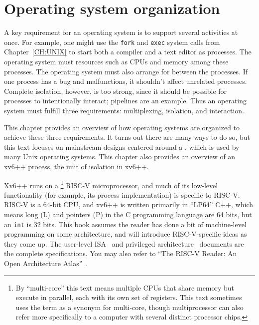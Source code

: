 
\chapter{Operating system organization}
\label{CH:FIRST}

A key requirement for an operating system is to support several activities at once.  For
example,
one might use the {\tt fork} and {\tt exec} system calls from
Chapter~\ref{CH:UNIX}
to start both a compiler and a text editor as processes.
The operating system must
resources such as CPUs and memory among these processes.
The operating system must also arrange for
between the processes.
If one process has a bug and malfunctions,
it shouldn't affect unrelated processes.
Complete isolation, however, is too strong, since it should be possible for
processes to intentionally interact; pipelines are an example.
Thus
an operating system must fulfill three requirements: multiplexing, isolation,
and interaction.

This chapter provides an overview of how operating systems are
organized to achieve these three requirements.  It turns out there are
many ways to do so, but this text focuses on mainstream designs
centered around a , which is used by many
Unix operating systems.  This chapter also provides an overview of an
xv6++ process, the unit of isolation in xv6++.

Xv6++ runs on a \footnote{
By ``multi-core'' this text means multiple CPUs that share memory but execute
in parallel, each with its own set of registers.
This text sometimes uses the term
 as a synonym for multi-core,
though multiprocessor can also refer more specifically to a computer with
several distinct processor chips.} RISC-V microprocessor,
and much of its low-level
functionality (for example, its process implementation) is specific to
RISC-V.  RISC-V is a 64-bit CPU, and xv6++ is written primarily in ``LP64'' C++,
which means long (L) and pointers (P) in the C programming language
are 64 bits, but an {\tt int} is 32 bits.  This book assumes the reader has done
a bit of machine-level programming on some architecture, and will
introduce RISC-V-specific ideas as they come up.
The user-level ISA~\cite{riscv:user} and privileged
architecture~\cite{riscv:priv} documents are the complete
specifications.
You may also refer to
``The RISC-V Reader: An Open Architecture
Atlas''~\cite{riscv}.

